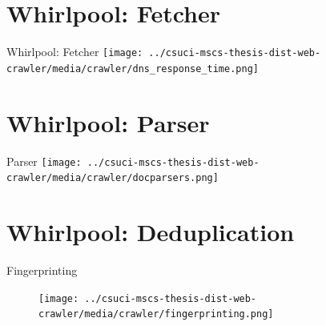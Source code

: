 \documentclass[9pt]{beamer}
\begin{document}

\section[Fetcher]{Whirlpool: Fetcher}
\begin{frame}[plain]
\end{frame}


\begin{frame}{Whirlpool: Fetcher}
  \centering
  \texttt{[image: ../csuci-mscs-thesis-dist-web-crawler/media/crawler/dns\_response\_time.png]}
\end{frame}


\section[Parser]{Whirlpool: Parser}
\begin{frame}[plain]
\end{frame}


\begin{frame}{Parser}
  \centering
  \texttt{[image: ../csuci-mscs-thesis-dist-web-crawler/media/crawler/docparsers.png]}
\end{frame}


\section[Dedupe]{Whirlpool: Deduplication}
\begin{frame}[plain]
\end{frame}


\begin{frame}{Fingerprinting}
  \begin{figure}
    \centering
    \texttt{[image: ../csuci-mscs-thesis-dist-web-crawler/media/crawler/fingerprinting.png]}
  \end{figure}
\end{frame}

\end{document}
